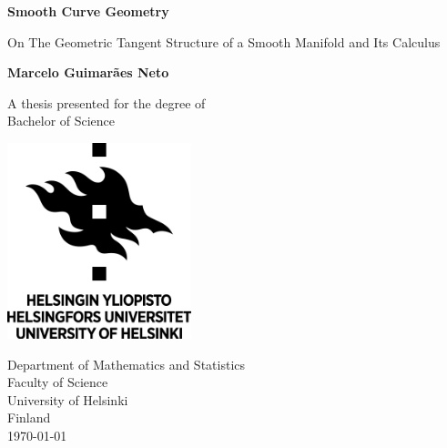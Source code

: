 \begin{titlepage}
    \begin{center}
        \vspace*{1cm}
            
        \Huge
        \textbf{Smooth Curve Geometry}
            
        \vspace{0.5cm}
        \LARGE
        On The Geometric Tangent Structure of a Smooth Manifold and Its Calculus
            
        \vspace{1.5cm}
            
        \textbf{Marcelo Guimarães Neto}
            
        \vfill
            
        A thesis presented for the degree of\\
        Bachelor of Science
            
        \vspace{0.8cm}
            
        \includegraphics[width=0.4\textwidth]{images/heluni-logo.png}
        
        \vspace{0.8cm}
            
        \Large
        Department of Mathematics and Statistics\\
        Faculty of Science\\
        University of Helsinki\\
        Finland\\
        \today
            
    \end{center}
\end{titlepage}